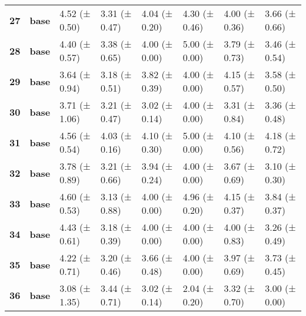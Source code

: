 \begin{longtable}{llllllll}
\cline{1-8}
\textbf{27} & \textbf{base} & 4.52 (± 0.50) & 3.31 (± 0.47) & 4.04 (± 0.20) & 4.30 (± 0.46) & 4.00 (± 0.36) & 3.66 (± 0.66) \\
\cline{1-8}
\textbf{28} & \textbf{base} & 4.40 (± 0.57) & 3.38 (± 0.65) & 4.00 (± 0.00) & 5.00 (± 0.00) & 3.79 (± 0.73) & 3.46 (± 0.54) \\
\cline{1-8}
\textbf{29} & \textbf{base} & 3.64 (± 0.94) & 3.18 (± 0.51) & 3.82 (± 0.39) & 4.00 (± 0.00) & 4.15 (± 0.57) & 3.58 (± 0.50) \\
\cline{1-8}
\textbf{30} & \textbf{base} & 3.71 (± 1.06) & 3.21 (± 0.47) & 3.02 (± 0.14) & 4.00 (± 0.00) & 3.31 (± 0.84) & 3.36 (± 0.48) \\
\cline{1-8}
\textbf{31} & \textbf{base} & 4.56 (± 0.54) & 4.03 (± 0.16) & 4.10 (± 0.30) & 5.00 (± 0.00) & 4.10 (± 0.56) & 4.18 (± 0.72) \\
\cline{1-8}
\textbf{32} & \textbf{base} & 3.78 (± 0.89) & 3.21 (± 0.66) & 3.94 (± 0.24) & 4.00 (± 0.00) & 3.67 (± 0.69) & 3.10 (± 0.30) \\
\cline{1-8}
\textbf{33} & \textbf{base} & 4.60 (± 0.53) & 3.13 (± 0.88) & 4.00 (± 0.00) & 4.96 (± 0.20) & 4.15 (± 0.37) & 3.84 (± 0.37) \\
\cline{1-8}
\textbf{34} & \textbf{base} & 4.43 (± 0.61) & 3.18 (± 0.39) & 4.00 (± 0.00) & 4.00 (± 0.00) & 4.00 (± 0.83) & 3.26 (± 0.49) \\
\cline{1-8}
\textbf{35} & \textbf{base} & 4.22 (± 0.71) & 3.20 (± 0.46) & 3.66 (± 0.48) & 4.00 (± 0.00) & 3.97 (± 0.69) & 3.73 (± 0.45) \\
\cline{1-8}
\textbf{36} & \textbf{base} & 3.08 (± 1.35) & 3.44 (± 0.71) & 3.02 (± 0.14) & 2.04 (± 0.20) & 3.32 (± 0.70) & 3.00 (± 0.00) \\
\cline{1-8}
\end{longtable}
